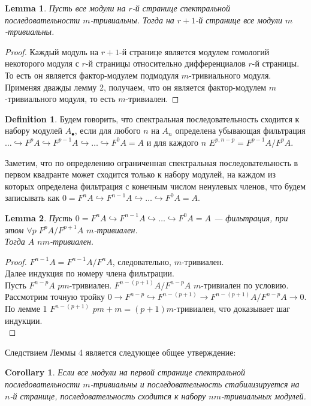 \documentclass[a4paper, 12pt]{article}
\newtheorem{lemma}{Lemma}
\newtheorem{corollary}{Corollary}
\theoremstyle{definition}
\newtheorem{definition}{Definition}
\theoremstyle{remark}
\begin{document}
\begin{lemma}
  Пусть все модули на $r$-й странице спектральной последовательности $m$-тривиальны. Тогда на $r+1$-й странице все модули $m$-тривиальны.
\end{lemma}
\begin{proof}
  Каждый модуль на $r+1$-й странице является модулем гомологий некоторого модуля с $r$-й страницы относительно дифференциалов $r$-й страницы. То есть он является фактор-модулем подмодуля $m$-тривиального модуля. Применяя дважды лемму 2, получаем, что он является фактор-модулем $m$-тривиального модуля, то есть $m$-тривиален.
\end{proof}

\begin{definition}
  Будем говорить, что спектральная последовательность сходится к набору модулей $A_{\bullet}$,
  если для любого $n$ на $A_n$ определена убывающая фильтрация $\ldots \hookrightarrow  F^pA \hookrightarrow F^{p-1}A \hookrightarrow \ldots \hookrightarrow F^0A = A$ и для каждого $n$ $E^{p,n-p} = F^{p-1}A/F^pA$.
\end{definition}

Заметим, что по определению ограниченная спектральная последовательность в первом квадранте может сходится только к набору модулей, на каждом из которых определена фильтрация с конечным числом ненулевых членов, что будем записывать как $0 = F^nA \hookrightarrow F^{n-1}A \hookrightarrow \ldots \hookrightarrow F^0A = A$.

\begin{lemma}
  Пусть $0 = F^nA \hookrightarrow F^{n-1}A \hookrightarrow \ldots \hookrightarrow F^0A = A$ --- фильтрация, при этом $\forall p\; F^pA/F^{p+1}A$ $m$-тривиален.\\
  Тогда $A$ $nm$-тривиален.
\end{lemma}

\begin{proof}
  $F^{n-1}A = F^{n-1}A/F^nA$, следовательно, $m$-тривиален.\\
  Далее индукция по номеру члена фильтрации.\\
  Пусть $F^{n-p}A$ $pm$-тривиален. $F^{n-(p+1)}A/F^{n-p}A$ $m$-тривиален по условию. Рассмотрим точную тройку $0 \to F^{n-p} \hookrightarrow F^{n-(p+1)} \rightarrow F^{n-(p+1)}A/F^{n-p}A \to 0$. По лемме 1 $F^{n-(p+1)}$ $pm+m=(p+1)m$-тривиален, что доказывает шаг индукции.\\
\end{proof}

Следствием Леммы 4 является следующее общее утверждение:
\begin{corollary}
  Если все модули на первой странице спектральной последовательности $m$-тривиальны и последовательность стабилизируется на $n$-й странице, последовательность сходится к набору $nm$-тривиальных модулей.
\end{corollary}
\end{document}
